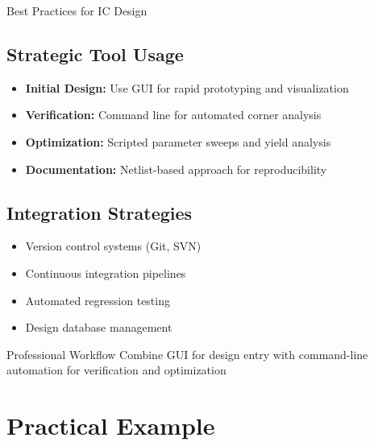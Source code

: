 \documentclass{beamer}
\begin{document}
\begin{frame}{Best Practices for IC Design}
    \subsection{Strategic Tool Usage}
    \begin{itemize}
        \item \textbf{Initial Design:} Use GUI for rapid prototyping and visualization
        \item \textbf{Verification:} Command line for automated corner analysis
        \item \textbf{Optimization:} Scripted parameter sweeps and yield analysis
        \item \textbf{Documentation:} Netlist-based approach for reproducibility
    \end{itemize}
    
    \subsection{Integration Strategies}
    \begin{itemize}
        \item Version control systems (Git, SVN)
        \item Continuous integration pipelines
        \item Automated regression testing
        \item Design database management
    \end{itemize}
    
    \begin{exampleblock}{Professional Workflow}
        Combine GUI for design entry with command-line automation for verification and optimization
    \end{exampleblock}
\end{frame}

\section{Practical Example}
\end{document}
